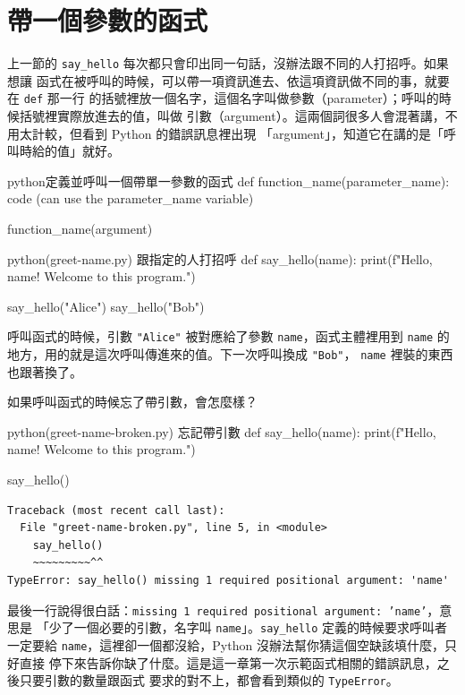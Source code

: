 \section{帶一個參數的函式}
\label{sec:function-param-basic}

上一節的 \texttt{say\_hello} 每次都只會印出同一句話，沒辦法跟不同的人打招呼。如果想讓
函式在被呼叫的時候，可以帶一項資訊進去、依這項資訊做不同的事，就要在 \texttt{def} 那一行
的括號裡放一個名字，這個名字叫做參數（parameter）；呼叫的時候括號裡實際放進去的值，叫做
引數（argument）。這兩個詞很多人會混著講，不用太計較，但看到 Python 的錯誤訊息裡出現
「argument」，知道它在講的是「呼叫時給的值」就好。

\begin{code}{python}{定義並呼叫一個帶單一參數的函式}
def function_name(parameter_name):
    code (can use the parameter_name variable)

function_name(argument)
\end{code}

\begin{example}{python}{(greet-name.py) 跟指定的人打招呼}
def say_hello(name):
    print(f"Hello, {name}! Welcome to this program.")


say_hello("Alice")
say_hello("Bob")
\end{example}


呼叫函式的時候，引數 \texttt{"Alice"} 被對應給了參數 \texttt{name}，函式主體裡用到
\texttt{name} 的地方，用的就是這次呼叫傳進來的值。下一次呼叫換成 \texttt{"Bob"}，
\texttt{name} 裡裝的東西也跟著換了。

如果呼叫函式的時候忘了帶引數，會怎麼樣？

\begin{example}{python}{(greet-name-broken.py) 忘記帶引數}
def say_hello(name):
    print(f"Hello, {name}! Welcome to this program.")


say_hello()
\end{example}

\begin{verbatim}
Traceback (most recent call last):
  File "greet-name-broken.py", line 5, in <module>
    say_hello()
    ~~~~~~~~~^^
TypeError: say_hello() missing 1 required positional argument: 'name'
\end{verbatim}

最後一行說得很白話：\texttt{missing 1 required positional argument: 'name'}，意思是
「少了一個必要的引數，名字叫 \texttt{name}」。\texttt{say\_hello} 定義的時候要求呼叫者
一定要給 \texttt{name}，這裡卻一個都沒給，Python 沒辦法幫你猜這個空缺該填什麼，只好直接
停下來告訴你缺了什麼。這是這一章第一次示範函式相關的錯誤訊息，之後只要引數的數量跟函式
要求的對不上，都會看到類似的 \texttt{TypeError}。

